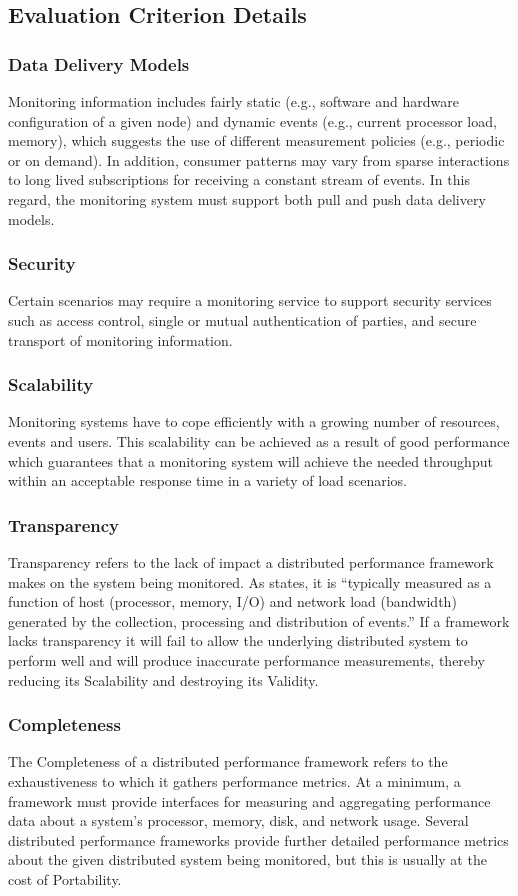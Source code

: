 \documentclass{beamer}
\begin{document}
\subsection{Evaluation Criterion Details}

\begin{frame}
\frametitle{Data Delivery Models}
Monitoring information includes fairly static (e.g., software and hardware configuration of a given node) and dynamic
events (e.g., current processor load, memory), which suggests the use of different measurement policies (e.g., periodic
or on demand). In addition, consumer patterns may vary from sparse interactions to long lived subscriptions for
receiving a constant stream of events. In this regard, the monitoring system must support both pull and push data
delivery models.
\end{frame}

\begin{frame}
\frametitle{Security}
Certain scenarios may require a monitoring service to support security services such as access control, single or mutual
authentication of parties, and secure transport of monitoring information.
\end{frame}

\begin{frame}
\frametitle{Scalability}
Monitoring systems have to cope efficiently with a growing number of resources, events and users. This scalability can
be achieved as a result of good performance which guarantees that a monitoring system will achieve the needed throughput
within an acceptable response time in a variety of load scenarios.
\end{frame}

\begin{frame}
\frametitle{Transparency}
Transparency refers to the lack of impact a distributed performance framework makes on the system being monitored. As
\cite{zanikolas2005} states, it is ``typically measured as a function of host (processor, memory, I/O) and network load
(bandwidth) generated by the collection, processing and distribution of events.'' If a framework lacks transparency it
will fail to allow the underlying distributed system to perform well and will produce inaccurate performance
measurements, thereby reducing its Scalability and destroying its Validity.
\end{frame}

\begin{frame}
\frametitle{Completeness}
The Completeness of a distributed performance framework refers to the exhaustiveness to which it gathers performance
metrics. At a minimum, a framework must provide interfaces for measuring and aggregating performance data about a
system's processor, memory, disk, and network usage. Several distributed performance frameworks provide further detailed
performance metrics about the given distributed system being monitored, but this is usually at the cost of Portability.
\end{frame}
\end{document}
